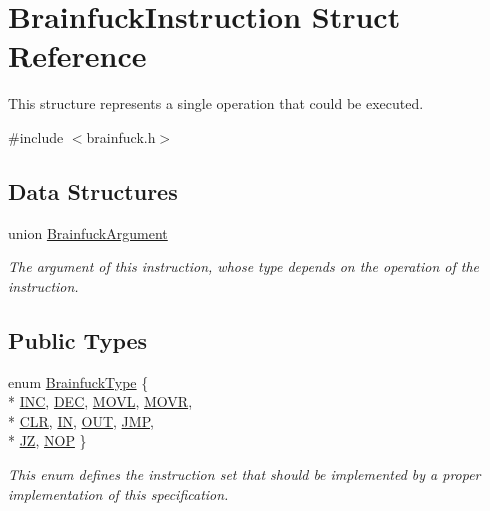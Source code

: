 \hypertarget{structBrainfuckInstruction}{}\section{Brainfuck\+Instruction Struct Reference}
\label{structBrainfuckInstruction}


This structure represents a single operation that could be executed.  




{\ttfamily \#include $<$brainfuck.\+h$>$}

\subsection*{Data Structures}
\begin{DoxyCompactItemize}
\item 
union \hyperlink{unionBrainfuckInstruction_1_1BrainfuckArgument}{Brainfuck\+Argument}
\begin{DoxyCompactList}\small\item\em The argument of this instruction, whose type depends on the operation of the instruction. \end{DoxyCompactList}\end{DoxyCompactItemize}
\subsection*{Public Types}
\begin{DoxyCompactItemize}
\item 
enum \hyperlink{group__ast_ga536105595916938ef76e66bb1cdf7b2b}{Brainfuck\+Type} \{ \\*
\hyperlink{group__ast_gga536105595916938ef76e66bb1cdf7b2bad430fd56820303a90e73ceb42ee688c3}{I\+N\+C}, 
\hyperlink{group__ast_gga536105595916938ef76e66bb1cdf7b2ba79ab7bfb7d4524c305179cbb06b578a0}{D\+E\+C}, 
\hyperlink{group__ast_gga536105595916938ef76e66bb1cdf7b2ba62cd33d0946e6731f9b0d5c27797d3a9}{M\+O\+V\+L}, 
\hyperlink{group__ast_gga536105595916938ef76e66bb1cdf7b2ba7c1e82a95b7561d0dd74aab47eb36964}{M\+O\+V\+R}, 
\\*
\hyperlink{group__ast_gga536105595916938ef76e66bb1cdf7b2bac1fb5c131100a52e04b9b2a0b000529d}{C\+L\+R}, 
\hyperlink{group__ast_gga536105595916938ef76e66bb1cdf7b2baf95611cfc6305a83b391a18c19408d73}{I\+N}, 
\hyperlink{group__ast_gga536105595916938ef76e66bb1cdf7b2bac2a4e58f27685769e6f5785073520725}{O\+U\+T}, 
\hyperlink{group__ast_gga536105595916938ef76e66bb1cdf7b2ba5a4e446f0609b6e81c63cbaa2ad98e1d}{J\+M\+P}, 
\\*
\hyperlink{group__ast_gga536105595916938ef76e66bb1cdf7b2ba46c8adfb23d44852d6e1a04d96cb1d66}{J\+Z}, 
\hyperlink{group__ast_gga536105595916938ef76e66bb1cdf7b2ba02f03773b12443d2e4b834d140e5eb8f}{N\+O\+P}
 \}
\begin{DoxyCompactList}\small\item\em This enum defines the instruction set that should be implemented by a proper implementation of this specification. \end{DoxyCompactList}\end{DoxyCompactItemize}
